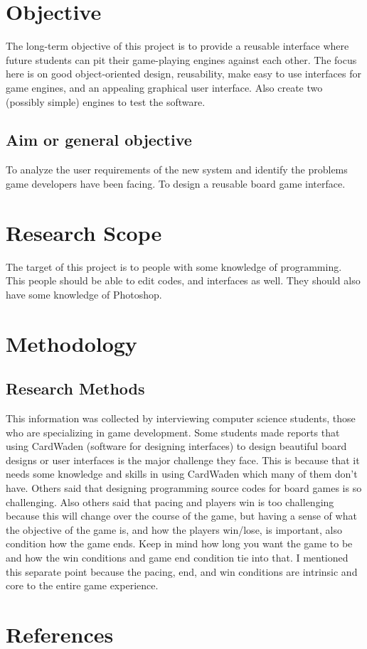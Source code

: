 \documentclass[a4paper,12pt]{article}
\begin{document}
\section{	Objective}
The long-term objective of this project is to provide a reusable interface where future students can pit their game-playing engines against each other. The focus here is on good object-oriented design, reusability, make easy to use interfaces for game engines, and an appealing graphical user interface. Also create two (possibly simple) engines to test the software.


\subsection{Aim or general objective}
To analyze the user requirements of the new system and identify the problems game developers have been facing. 
To design a reusable board game interface. 
\section{Research Scope}
The target of this project is to people with some knowledge of programming. 
This people should be able to edit codes, and interfaces as well. 
They should also have some knowledge of Photoshop.
	
\section{Methodology}
\subsection{Research Methods}
This information was collected by interviewing computer science students, those who are specializing in game development. Some students made reports that using CardWaden (software for designing interfaces) to design beautiful board designs or user interfaces is the major challenge they face. This is because that it needs some knowledge and skills in using CardWaden which many of them don’t have. Others said that designing programming source codes for board games is so challenging.  Also others said that pacing and players win is too challenging because this will change over the course of the game, but having a sense of what the objective of the game is, and how the players win/lose, is important, also condition how the game ends. Keep in mind how long you want the game to be and how the win conditions and game end condition tie into that. I mentioned this separate point because the pacing, end, and win conditions are intrinsic and core to the entire game experience.
\section{References}{

}
\end{document}
